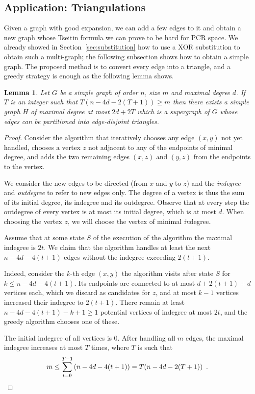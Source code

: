 \documentclass[11pt]{article}
\numberwithin{equation}{section}
\newtheorem{lemma}[theorem]{Lemma}
\theoremstyle{definition}
\theoremstyle{plain}
\theoremstyle{plain}
\theoremstyle{definition}
\newcommand{\introduceterm}[1]{{\emph{#1}}}
\newcommand{\eqperiod}{\enspace .}
\newcommand{\refsecapp}[1]{Section~\ref{#1}}
\begin{document}
\subsection{Application: Triangulations}
\label{sec:triangulations}

Given a graph with good expansion, we can add a few edges to it and obtain a new graph whose Tseitin formula we can prove to be hard for PCR space. We already showed in \refsecapp{sec:substitution} how to use a XOR substitution to obtain such a multi-graph; the following subsection shows how to obtain a simple graph. The proposed method is to convert every edge into a triangle, and a greedy strategy is enough as the following lemma shows.

\begin{lemma}
\label{lem:triangulation}
  Let $G$ be a simple graph of order $n$, size $m$ and maximal degree $d$. If $T$ is an integer such that $T(n-4d-2(T+1))\geq m$ then there exists a simple graph $H$ of maximal degree at most $2d+2T$ which is a supergraph of $G$ whose edges can be partitioned into edge-disjoint triangles.
\end{lemma}

\begin{proof}
  Consider the algorithm that iteratively chooses any edge $(x,y)$ not yet handled, chooses a vertex $z$ not adjacent to any of the endpoints of minimal degree, and adds the two remaining edges $(x,z)$ and $(y,z)$ from the endpoints to the vertex.

We consider the new edges to be directed (from $x$ and $y$ to $z$) and the \introduceterm{indegree} and \introduceterm{outdegree} to refer to new edges only. The degree of a vertex is thus the sum of its initial degree, its indegree and its outdegree. Observe that at every step the outdegree of every vertex is at most its initial degree, which is at most $d$. When choosing the vertex $z$, we will choose the vertex of minimal \emph{in}degree.

Assume that at some state $S$ of the execution of the algorithm the maximal indegree is $2t$. We claim that the algorithm handles at least the next $n-4d-4(t+1)$ edges without the indegree exceeding $2(t+1)$.

Indeed, consider the $k$-th edge $(x,y)$ the algorithm visits after state $S$ for $k \leq n-4d-4(t+1)$. Its endpoints are connected to at most $d+2(t+1)+d$ vertices each, which we discard as candidates for $z$, %
and at most $k-1$ vertices increased their indegree to $2(t+1)$.
%
There remain at least $n-4d-4(t+1)-k+1\geq 1$ potential vertices of indegree at most $2t$, and the greedy algorithm chooses one of these.

%
The initial indegree of all vertices is $0$. After handling all $m$ edges, the maximal indegree increases at most $T$ times, where $T$ is such that
\begin{equation}
  \label{eq:triangulation-bound}
  m\leq \sum_{t=0}^{T-1}\left(n-4d-4(t+1)\right) = T(n-4d-2(T+1)) \eqperiod \qedhere
\end{equation}
\end{proof}
\end{document}
